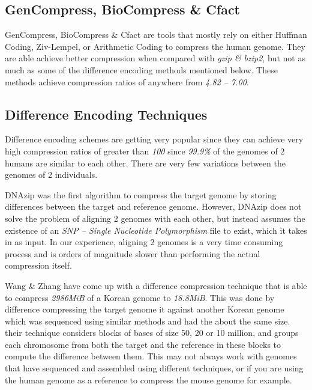 \documentclass[11pt]{article}
\begin{document}
\subsection{GenCompress, BioCompress \& Cfact}

GenCompress\cite{gencompress}, BioCompress\cite{biocompress} \&
Cfact\cite{cfact} are tools that mostly rely on either Huffman Coding,
Ziv-Lempel\cite{zivlempel}, or Arithmetic Coding to compress the human
genome. They are able achieve better compression when compared with
\textit{gzip \& bzip2}, but not as much as some of the difference
encoding methods mentioned below. These methods achieve compression
ratios of anywhere from \textit{4.82 -- 7.00}.

\subsection{Difference Encoding Techniques}

Difference encoding schemes are getting very popular since they can
achieve very high compression ratios of greater than \textit{100}
since \textit{99.9\%} of the genomes of 2 humans are similar to each
other. There are very few variations between the genomes of 2
individuals.

DNAzip\cite{dnazip}\cite{genomecompressionchenli} was the first
algorithm to compress the target genome by storing differences between
the target and reference genome. However, DNAzip does not solve the
problem of aligning 2 genomes with each other, but instead assumes the
existence of an \textit{SNP -- Single Nucleotide Polymorphism} file to
exist, which it takes in as input. In our experience, aligning 2
genomes is a very time consuming process and is orders of magnitude
slower than performing the actual compression itself.

Wang \& Zhang\cite{wangzhang} have come up with a difference
compression technique that is able to compress \textit{2986MiB} of a
Korean genome to \textit{18.8MiB}. This was done by difference
compressing the target genome it against another Korean genome which
was sequenced using similar methods and had the about the same
size. their technique considers blocks of bases of size 50, 20 or 10
million, and groups each chromosome from both the target and the
reference in these blocks to compute the difference between them. This
may not always work with genomes that have sequenced and assembled
using different techniques, or if you are using the human genome as a
reference to compress the mouse genome for example.
\end{document}
